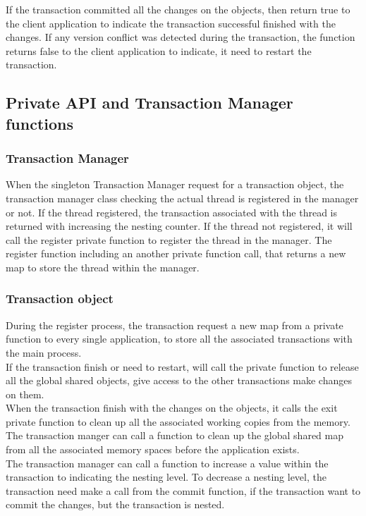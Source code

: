 \documentclass[12pt]{article}
\begin{document}
If the transaction committed all the changes on the objects, then return true to the client application to indicate the transaction successful finished with the changes. If any version conflict was detected during the transaction, the function  returns false to the client application to indicate, it need to restart the transaction.
\subsection{Private API and Transaction Manager functions}
\subsubsection{Transaction Manager}

When the singleton Transaction Manager request for a transaction object, the transaction manager class checking the actual thread is registered in the manager or not. If the thread registered, the transaction associated with the thread is returned with increasing the nesting counter. If the thread not registered, it will call the register private function to register the thread in the manager. The register function including an another private function call, that returns a new map to store the thread within the manager.

\subsubsection{Transaction object}
During the register process, the transaction request a new map from a private function to every single application, to store all the associated transactions with the main process.\\
If the transaction finish or need to restart, will call the private function to release all the global shared objects, give access to the other transactions make changes on them.\\ 
When the transaction finish with the changes on the objects, it calls the exit private function to clean up all the associated working copies from the memory.\\
The transaction manger can  call a function to clean up the global shared map from all the associated memory spaces before the application exists.\\
The transaction manager can call a function to increase a value within the transaction to indicating the nesting level. To decrease a nesting level, the transaction need make a call from the commit function, if the transaction want to commit the changes, but the transaction is nested.
\end{document}
